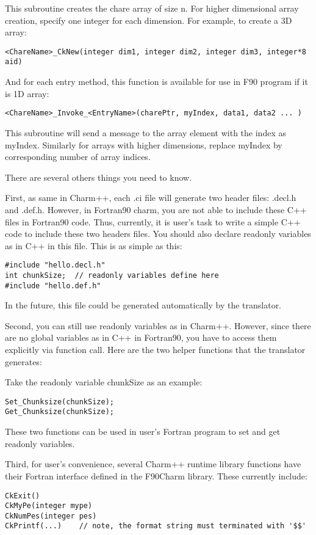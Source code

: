 \documentclass[11pt]{article}
\begin{document}
  This subroutine creates the chare array of size n. For higher dimensional
array creation, specify one integer for each dimension. For example, to create
a 3D array:

  \verb+<ChareName>_CkNew(integer dim1, integer dim2, integer dim3, integer*8 aid)+

And for each entry method, this function is available for use in F90 program
if it is 1D array:

  \verb+<ChareName>_Invoke_<EntryName>(charePtr, myIndex, data1, data2 ... )+

  This subroutine will send a message to the array element with the index
as myIndex. Similarly for arrays with higher dimensions, replace myIndex by
corresponding number of array indices.

There are several others things you need to know.

First, as same in Charm++, each .ci file will generate two header files:
.decl.h and .def.h. However, in Fortran90 charm, you are not able to include 
these C++ files in Fortran90 code. Thus, currently, it is user's 
task to write a simple C++ code to include these two headers files. 
You should also declare readonly variables as in C++ in this file. This is as 
simple as this:

\begin{verbatim}
#include "hello.decl.h"
int chunkSize; 	// readonly variables define here
#include "hello.def.h"
\end{verbatim}

In the future, this file could be generated automatically by the translator.

Second, you can still use readonly variables as in Charm++. However, since
there are no global variables as in C++ in Fortran90, you have to access them
explicitly via function call. Here are the two helper functions that the 
translator generates:

Take the readonly variable chunkSize as an example:
\begin{verbatim}
Set_Chunksize(chunkSize);
Get_Chunksize(chunkSize);
\end{verbatim}
These two functions can be used in user's Fortran program to set and get 
readonly variables.

Third, for user's convenience, several Charm++ runtime library functions
have their Fortran interface defined in the F90Charm library. These currently
include:
\begin{verbatim}
CkExit()
CkMyPe(integer mype)
CkNumPes(integer pes)
CkPrintf(...)    // note, the format string must terminated with '$$'
\end{verbatim}
\end{document}
